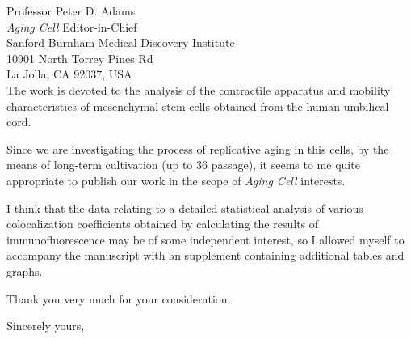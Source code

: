 \documentclass[11pt]{letter} %
\begin{document}
\begin{letter}{
Professor Peter D. Adams \\
\emph{Aging Cell} Editor-in-Chief \\
Sanford Burnham Medical Discovery Institute \\
10901 North Torrey Pines Rd \\
La Jolla, CA 92037, USA\\}
The work is devoted to the analysis of the contractile apparatus and mobility characteristics of mesenchymal stem cells obtained from the human umbilical cord.

Since we are investigating the process of replicative aging in this cells, by the means of long-term cultivation (up to 36 passage), it seems to me quite appropriate to publish our work in the scope of \emph{Aging Cell} interests.

I think that the data relating to a detailed statistical analysis of various colocalization coefficients obtained by calculating the results of immunofluorescence may be of some independent interest, so I allowed myself to accompany the manuscript with an supplement containing additional tables and graphs.

Thank you very much for your consideration.

\closing{Sincerely yours, }




\end{letter}
\end{document}
